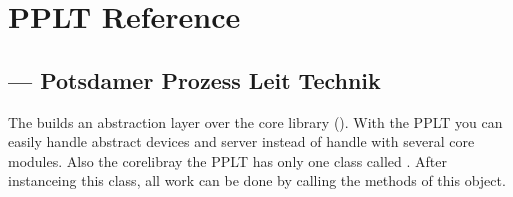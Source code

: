 \chapter{PPLT Reference}
\section{ ---
        \textbf{P}otsdamer \textbf{P}rozess \textbf{L}eit \textbf{T}echnik}


The  builds an abstraction layer over the core library 
(). With the PPLT you can easily handle abstract devices and 
server instead of handle with several core modules. Also the corelibray the 
PPLT has only one class called . After instanceing this class, all
work can be done by calling the methods of this object.

